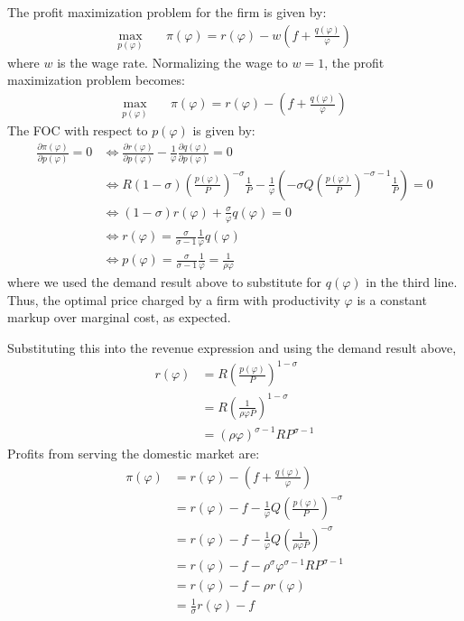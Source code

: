 \begin{solution}
    The profit maximization problem for the firm is given by:
    \begin{align*}
        \max_{p(\varphi)} \quad & \pi(\varphi) = r(\varphi) - w\left( f + \frac{q(\varphi)}{\varphi} \right)
    \end{align*}
    where $w$ is the wage rate. Normalizing the wage to $w = 1$, the profit maximization problem becomes:
    \begin{align*}
        \max_{p(\varphi)} \quad & \pi(\varphi) = r(\varphi) - \left( f + \frac{q(\varphi)}{\varphi} \right)
    \end{align*}
    The FOC with respect to $p(\varphi)$ is given by:
    \begin{align*}
        \frac{\partial \pi(\varphi)}{\partial p(\varphi)} = 0 &\iff \frac{\partial r(\varphi)}{\partial p(\varphi)} - \frac{1}{\varphi} \frac{\partial q(\varphi)}{\partial p(\varphi)} = 0 \\
        &\iff R(1 - \sigma) \left( \frac{p(\varphi)}{P} \right)^{-\sigma} \frac{1}{P} - \frac{1}{\varphi} \left( -\sigma Q \left( \frac{p(\varphi)}{P} \right)^{-\sigma - 1} \frac{1}{P} \right) = 0 \\
        &\iff (1 - \sigma) r(\varphi) + \frac{\sigma}{\varphi} q(\varphi) = 0 \\
        &\iff r(\varphi) = \frac{\sigma}{\sigma - 1} \frac{1}{\varphi} q(\varphi) \\
        &\iff p(\varphi) = \frac{\sigma}{\sigma - 1} \frac{1}{\varphi} = \frac{1}{\rho\varphi} 
    \end{align*}
    where we used the demand result above to substitute for $q(\varphi)$ in the third line. Thus, the optimal price charged by a firm with productivity $\varphi$ is a constant markup over marginal cost, as expected.
    
    Substituting this into the revenue expression and using the demand result above,
    \begin{align*}
        r(\varphi) &= R \left( \frac{p(\varphi)}{P} \right)^{1 - \sigma} \\
        &= R \left( \frac{1}{\rho \varphi P} \right)^{1 - \sigma} \\
        &= (\rho \varphi)^{\sigma - 1} R P^{\sigma - 1}
    \end{align*} 
    Profits from serving the domestic market are: 
    \begin{align*}
        \pi(\varphi) &= r(\varphi) - \left( f + \frac{q(\varphi)}{\varphi} \right) \\
        &= r(\varphi) - f - \frac{1}{\varphi} Q \left( \frac{p(\varphi)}{P} \right)^{-\sigma} \\
        &= r(\varphi) - f - \frac{1}{\varphi} Q \left( \frac{1}{\rho\varphi P} \right)^{-\sigma} \\
        &= r(\varphi) - f -  \rho^{\sigma} \varphi^{\sigma - 1} R P^{\sigma - 1} \\
        &= r(\varphi) - f -  \rho r(\varphi) \\
        &= \frac{1}{\sigma} r(\varphi) - f
    \end{align*}
    

\end{solution}
